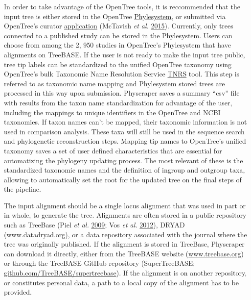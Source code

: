 \documentclass[]{article}
\begin{document}
In order to take advantage of the OpenTree tools, it is reccommended that the input tree is either stored in the
OpenTree \href{https://github.com/opentreeoflife/phylesystem}{Phylesystem}, or submitted via OpenTree's curator \href{https://tree.opentreeoflife.org/curator}{application} (McTavish \emph{et al.} \protect\hyperlink{ref-mctavish2015phylesystem}{2015}).
Currently, only trees connected to a published study can be stored in the Phylesystem.
Users can choose from among the 2, 950 studies in OpenTree's Phylesystem that have alignments on TreeBASE.
If the user is not ready to make the input tree public, tree tip labels can be standardized to the unified OpenTree taxonomy using OpenTree's bulk Taxonomic Name Resolution Service \href{https://tree.opentreeoflife.org/curator/tnrs/}{TNRS} tool.
This step is referred to as taxonomic name mapping and Phylesystem stored trees are processed in this way upon submission.
Physcraper saves a summary ``csv'' file with results from the taxon name standardization for advantage of the user, including the mappings to unique identifiers in the OpenTree and NCBI taxonomies.
If taxon names can't be mapped, their taxonomic information is not used in comparison analysis. These taxa will still be used in the sequence search and phylogenetic reconstruction steps.
Mapping tip names to OpenTree's unified taxonomy saves a set of user defined characteristics
that are essential for automatizing the phylogeny updating process. The most relevant of these is the standardized taxonomic names and the definition of ingroup and outgroup taxa, allowing to automatically set the root for the updated tree on the final steps of the pipeline.

The input alignment should be a single locus alignment that was used in part or in whole, to generate the tree. Alignments are often stored in a public repository such as TreeBase (Piel \emph{et al.} \protect\hyperlink{ref-piel2009treebase}{2009}; Vos \emph{et al.} \protect\hyperlink{ref-vos2012nexml}{2012}),
DRYAD (\href{http://datadryad.org/}{www.datadryad.org}), or a data repository associated with the journal where the tree was originally published.
If the alignment is stored in TreeBase, Physcraper can download it directly,
either from the TreeBASE website (\href{https://treebase.org/}{www.treebase.org})
or through the TreeBASE GitHub repository (SuperTreeBASE; \href{https://github.com/TreeBASE/supertreebase}{github.com/TreeBASE/supertreebase}).
If the alignment is on another repository, or constitutes personal data, a path to a local copy of the alignment has to be provided.
\end{document}
